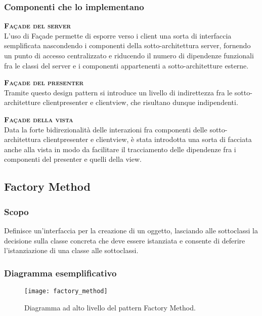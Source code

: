 \subsubsection{Componenti che lo implementano}
\begin{description}
  \item{\scshape\bfseries Façade del server}\\
L'uso di Façade permette di esporre verso i client una sorta di interfaccia semplificata nascondendo i componenti della sotto-architettura server, fornendo un punto di accesso centralizzato e riducendo il numero di dipendenze funzionali fra le classi del server e i componenti appartenenti a sotto-architetture esterne.
  \item{\scshape\bfseries Façade del presenter}\\
Tramite questo design pattern si introduce un livello di indirettezza fra le sotto-architetture clientpresenter e clientview, che risultano dunque indipendenti.
  \item{\scshape\bfseries Façade della vista}\\
Data la forte bidirezionalità delle interazioni fra componenti delle sotto-architettura clientpresenter e clientview, è stata introdotta una sorta di facciata anche alla vista in modo da facilitare il tracciamento delle dipendenze fra i componenti del presenter e quelli della view.
\end{description}

\subsection{Factory Method}

\subsubsection{Scopo}
Definisce un'interfaccia per la creazione di un oggetto, lasciando alle sottoclassi la decisione sulla classe concreta che deve essere istanziata e consente di deferire l'istanziazione di una classe alle sottoclassi.

\subsubsection{Diagramma esemplificativo}
\begin{figure}[H]
\centering
\texttt{[image: factory\_method]}
\caption{Diagramma ad alto livello del pattern Factory Method.}\label{fig:factory_method}
\end{figure}

